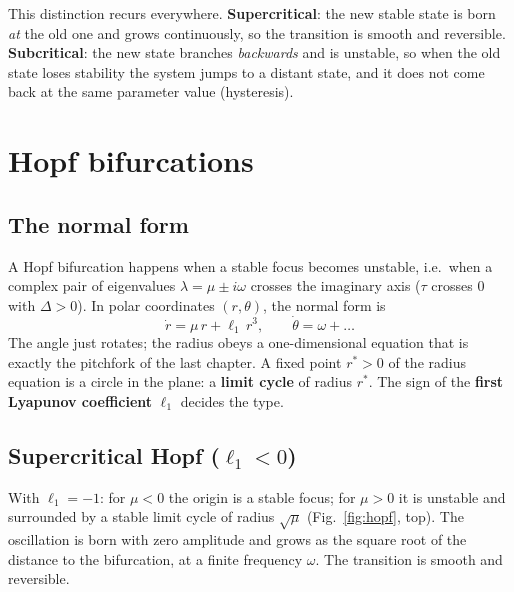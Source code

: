 \documentclass[11pt,openany]{report}
\begin{document}
\begin{keyidea}
This distinction recurs everywhere. \textbf{Supercritical}: the new stable state is born \emph{at} the old one and grows
continuously, so the transition is smooth and reversible. \textbf{Subcritical}: the new state branches \emph{backwards}
and is unstable, so when the old state loses stability the system jumps to a distant state, and it does not come back
at the same parameter value (hysteresis).
\end{keyidea}

\chapter{Hopf bifurcations}
\section{The normal form}
A Hopf bifurcation happens when a stable focus becomes unstable, i.e.\ when a complex pair of eigenvalues
$\lambda = \mu\pm i\omega$ crosses the imaginary axis ($\tau$ crosses 0 with $\Delta>0$). In polar coordinates
$(r,\theta)$, the normal form is
\[
\dot r = \mu\,r + \ell_1\,r^3,\qquad \dot\theta = \omega + \dots
\]
The angle just rotates; the radius obeys a one-dimensional equation that is exactly the pitchfork of the last chapter. A
fixed point $r^*>0$ of the radius equation is a circle in the plane: a \textbf{limit cycle} of radius $r^*$. The sign of
the \textbf{first Lyapunov coefficient} $\ell_1$ decides the type.

\section{Supercritical Hopf ($\ell_1<0$)}
With $\ell_1 = -1$: for $\mu<0$ the origin is a stable focus; for $\mu>0$ it is unstable and surrounded by a stable
limit cycle of radius $\sqrt\mu$ (Fig.~\ref{fig:hopf}, top). The oscillation is born with zero amplitude and grows as the
square root of the distance to the bifurcation, at a finite frequency $\omega$. The transition is smooth and reversible.
\end{document}
